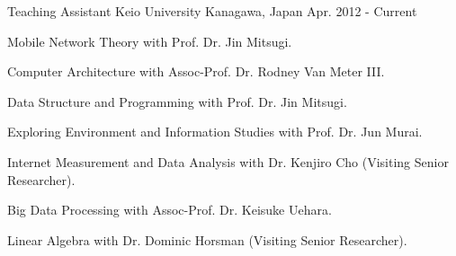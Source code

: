 \begin{cventries}
  \cventry
    {Teaching Assistant} %
    {Keio University} %
    {Kanagawa, Japan} %
    {Apr. 2012 - Current} %
    {
      \begin{cvitems} %
        \item {Mobile Network Theory with Prof. Dr. Jin Mitsugi.}
        \item {Computer Architecture with Assoc-Prof. Dr. Rodney Van Meter III.}
        \item {Data Structure and Programming with Prof. Dr. Jin Mitsugi.}
        \item {Exploring Environment and Information Studies with Prof. Dr. Jun Murai.}
        \item {Internet Measurement and Data Analysis with Dr. Kenjiro Cho (Visiting Senior Researcher).}
        \item {Big Data Processing with Assoc-Prof. Dr. Keisuke Uehara.}
        \item {Linear Algebra with Dr. Dominic Horsman (Visiting Senior Researcher).}
      \end{cvitems}
    }

\end{cventries}
